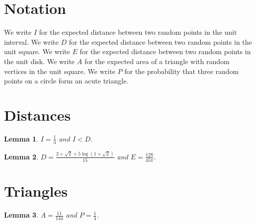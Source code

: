 \documentclass{article}
\newtheorem{lemma}{Lemma}
\begin{document}
\section{Notation}

We write $I$ for the expected distance between two random points in the unit interval.
We write $D$ for the expected distance between two random points in the unit square.
We write $E$ for the expected distance between two random points in the unit disk.
We write $A$ for the expected area of a triangle with random vertices in the unit square.
We write $P$ for the probability that three random points on a circle form an acute triangle.

\section{Distances}

\begin{lemma}\label{interval}
$I=\frac13$ and $I<D$.
\end{lemma}

\begin{lemma}\label{square}
$D=\frac{2+\sqrt{2}+5\log(1+\sqrt{2})}{15}$ and $E=\frac{128}{45\pi}$.
\end{lemma}

\section{Triangles}

\begin{lemma}\label{triangles}
$A=\frac{11}{144}$ and $P=\frac14$.
\end{lemma}
\end{document}
